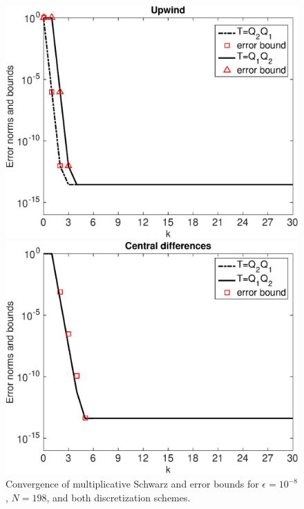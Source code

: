\begin{figure}[tbhp]
\begin{minipage}[t]{0.49\linewidth}
\includegraphics[width=0.95\linewidth]{figures/mSm_upwind_eps_1e-08_N_198}
\end{minipage}
%
\begin{minipage}[t]{0.49\linewidth}
\includegraphics[width=0.95\linewidth]{figures/mSm_central_eps_1e-08_N_198}
\end{minipage}
\caption{Convergence of multiplicative Schwarz and error bounds for
$\epsilon=10^{-8}$, $N=198$, and both discretization schemes.}
\label{fig:1D:MSM.N198.eps8}
\end{figure}

